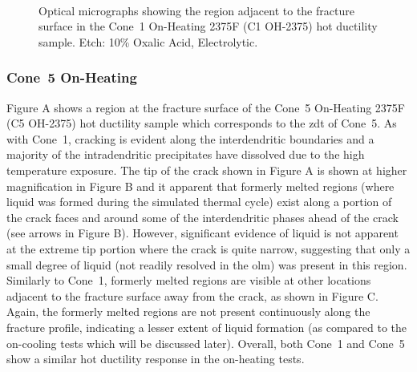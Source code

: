 \begin{figure}
\centering
{} \\
\caption{Optical micrographs showing the region adjacent to the fracture surface in the Cone~1 On-Heating 2375F (C1 OH-2375) hot ductility sample. Etch: 10\% Oxalic Acid, Electrolytic.}
\label{fig:c1-oh-2375}
\end{figure}

\subsubsection{Cone~5 On-Heating}
Figure A shows a region at the fracture surface of the Cone~5 On-Heating 2375F (C5 OH-2375) hot ductility sample which corresponds to the \gls{zdt} of Cone~5. As with Cone~1, cracking is evident along the interdendritic boundaries and a majority of the intradendritic precipitates have dissolved due to the high temperature exposure. The tip of the crack shown in Figure A is shown at higher magnification in Figure B and it apparent that formerly melted regions (where liquid was formed during the simulated thermal cycle) exist along a portion of the crack faces and around some of the interdendritic phases ahead of the crack (see arrows in Figure B). However, significant evidence of liquid is not apparent at the extreme tip portion where the crack is quite narrow, suggesting that only a small degree of liquid (not readily resolved in the \gls{olm}) was present in this region. Similarly to Cone~1, formerly melted regions are visible at other locations adjacent to the fracture surface away from the crack, as shown in Figure C. Again, the formerly melted regions are not present continuously along the fracture profile, indicating a lesser extent of liquid formation (as compared to the on-cooling tests which will be discussed later). Overall, both Cone~1 and Cone~5 show a similar hot ductility response in the on-heating tests.

